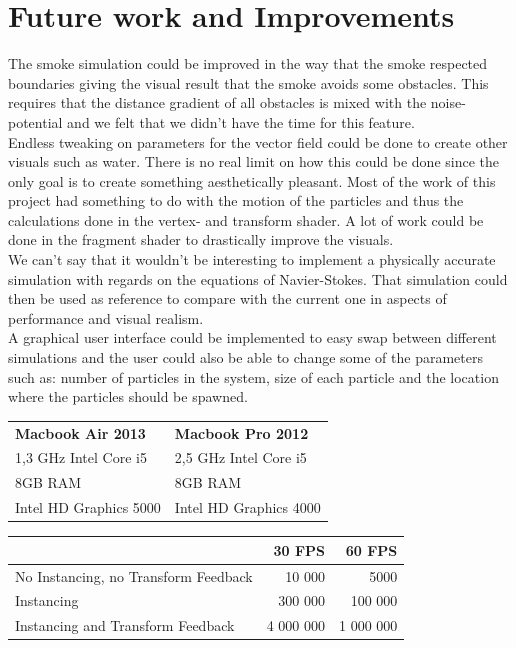 \documentclass[report]{vgtc}
\begin{document}
\section{Future work and Improvements}
The smoke simulation could be improved in the way that the smoke respected boundaries giving the visual result that the smoke avoids some obstacles. This requires that the distance gradient of all obstacles is mixed with the noise-potential and we felt that we didn’t have the time for this feature. \\
Endless tweaking on parameters for the vector field could be done to create other visuals such as water. There is no real limit on how this could be done since the only goal is to create something aesthetically pleasant. Most of the work of this project had something to do with the motion of the particles and thus the calculations done in the vertex- and transform shader. A lot of work could be done in the fragment shader to drastically improve the visuals.\\
We can’t say that it wouldn’t be interesting to implement a physically accurate simulation with regards on the equations of Navier-Stokes. That simulation could then be used as reference to compare with the current one in aspects of performance and visual realism. \\
A graphical user interface could be implemented to easy swap between different simulations and the user could also be able to change some of the parameters such as: number of particles in the system, size of each particle and the location where the particles should be spawned. 


	

\def\arraystretch{1.5}%
	\begin{table}[h]
		\begin{tabular}{| ll |}
			\hline
			\textbf{Macbook Air 2013} & \textbf{Macbook Pro 2012} \\[0.75ex] %
			 1,3 GHz Intel Core i5  &   2,5 GHz Intel Core i5  \\[0.75ex]
			  8GB RAM & 8GB RAM    \\[0.75ex]
		 	 Intel HD Graphics 5000 &  Intel HD Graphics 4000   \\ [0.75ex]
			\hline
		\end{tabular}
	\end{table}	

	

	\begin{table}[h]
		\begin{tabular}{l | r | r}
			  & 30 FPS & 60 FPS   \\[0.75ex] \hline
  			No Instancing, no Transform Feedback & 10 000 & 5000  \\[0.75ex]
  			Instancing & 300 000 & 100 000  \\[0.75ex]
			Instancing and Transform Feedback & 4 000 000 & 1 000 000 \\[0.75ex]


		\end{tabular}
	\end{table}	
\end{document}
